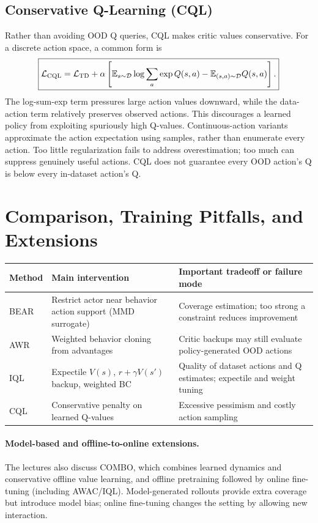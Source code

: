 \subsection{Conservative Q-Learning (CQL)}
Rather than avoiding OOD Q queries, CQL makes critic values conservative. For a discrete action space, a common form is
\[
\boxed{
\mathcal L_{\rm CQL}=
\mathcal L_{\rm TD}
+\alpha\left[
\mathbb{E}_{s\sim\mathcal{D}}\log\sum_a\exp Q(s,a)
-\mathbb{E}_{(s,a)\sim\mathcal{D}}Q(s,a)
\right].
}
\]
The log-sum-exp term pressures large action values downward, while the data-action term relatively preserves observed actions. This discourages a learned policy from exploiting spuriously high Q-values. Continuous-action variants approximate the action expectation using samples, rather than enumerate every action. Too little regularization fails to address overestimation; too much can suppress genuinely useful actions. CQL does not guarantee every OOD action's Q is below every in-dataset action's Q.

\section{Comparison, Training Pitfalls, and Extensions}
\begin{center}\small
\begin{tabularx}{\textwidth}{@{}p{}X X@{}}\toprule
Method & Main intervention & Important tradeoff or failure mode\\\midrule
BEAR & Restrict actor near behavior action support (MMD surrogate) & Coverage estimation; too strong a constraint reduces improvement\\
AWR & Weighted behavior cloning from advantages & Critic backups may still evaluate policy-generated OOD actions\\
IQL & Expectile $V(s)$, $r+\gamma V(s')$ backup, weighted BC & Quality of dataset actions and Q estimates; expectile and weight tuning\\
CQL & Conservative penalty on learned Q-values & Excessive pessimism and costly action sampling\\\bottomrule
\end{tabularx}
\end{center}

\paragraph{Model-based and offline-to-online extensions.}
The lectures also discuss COMBO, which combines learned dynamics and conservative offline value learning, and offline pretraining followed by online fine-tuning (including AWAC/IQL). Model-generated rollouts provide extra coverage but introduce model bias; online fine-tuning changes the setting by allowing new interaction.


